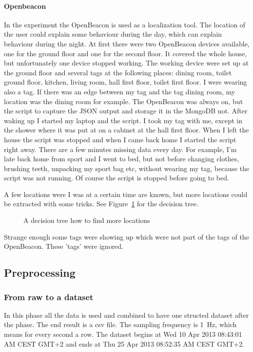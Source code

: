 		\paragraph{Openbeacon}
			In the experiment the OpenBeacon is used as a localization tool. The location of the user could explain some behaviour during the day, which can explain behaviour during the night. At first there were two OpenBeacon devices available, one for the ground floor and one for the second floor. It covered the whole house, but unfortunately one device stopped working. The working device were set up at the ground floor and several tags at the following places: dining room, toilet ground floor, kitchen, living room, hall first floor, toilet first floor. I were wearing also a tag. If there was an edge between my tag and the tag dining room, my location was the dining room for example. The OpenBeacon was always on, but the script to capture the JSON output and storage it in the MongoDB not. After waking up I started my laptop and the script. I took my tag with me, except in the shower where it was put at on a cabinet at the hall first floor. When I left the house the script was stopped and when I came back home I started the script right away. There are a few minutes missing data every day. For example, I'm late back home from sport and I went to bed, but not before changing clothes, brushing teeth, unpacking my sport bag etc, without wearing my tag, because the script was not running. Of course the script is stopped before going to bed.
			
			A few locations were I was at a certain time are known, but more locations could be extracted with some tricks. See Figure~\ref{fig:decisiontree} for the decision tree.

				\begin{figure}[h!]
					
					\caption{A decision tree how to find more locations}
					\label{fig:decisiontree}
				\end{figure}

				Strange enough some tags were showing up which were not part of the tags of the OpenBeacon. These 'tags' were ignored.
				
	\subsection{Preprocessing}
		\label{sec:preprocessing}
		\subsubsection{From raw to a dataset}
			In this phase all the data is used and combined to have one structed dataset after the phase. The end result is a csv file. The sampling frequency is \SI{1}{\hertz}, which means for every second a row. The dataset begins at Wed 10 Apr 2013 08:43:01 AM CEST GMT+2 and ends at Thu 25 Apr 2013 08:52:35 AM CEST GMT+2. 
			
